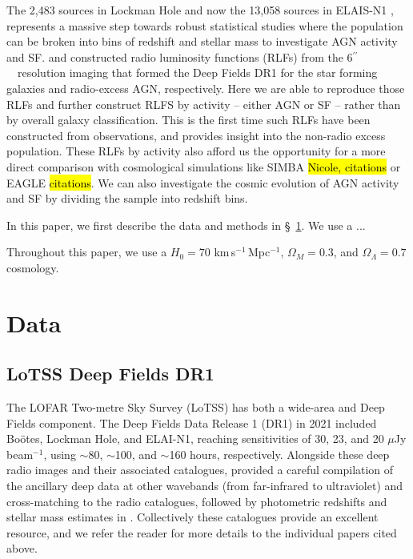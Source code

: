 \documentclass[usenatbib,fleqn,letters]{mnras}
\newcommand{\sarc}{$^{\prime\prime}\!\!$}
\newcommand{\muJybm}{$\mu$Jy$\,$beam$^{-1}$}
\begin{document}
The 2,483 sources in Lockman Hole \citep{sweijen_deep_2022} and now the 13,058 sources in ELAIS-N1 \citep{de_jong_into_2024}, represents a massive step towards robust statistical studies where the population can be broken into bins of redshift and stellar mass to investigate AGN activity and SF.\cite{cochrane_lofar_2023} and \cite{kondapally_cosmic_2022} constructed radio luminosity functions (RLFs) from the 6\sarc\ \ resolution imaging that formed the Deep Fields DR1 for the star forming galaxies and radio-excess AGN, respectively.  Here we are able to reproduce those RLFs and further construct RLFS by activity -- either AGN or SF -- rather than by overall galaxy classification. This is the first time such RLFs have been constructed from observations, and provides insight into the non-radio excess population. These RLFs by activity also afford us the opportunity for a more direct comparison with cosmological simulations like SIMBA \hl{Nicole, citations} or EAGLE \hl{citations}. We can also investigate the cosmic evolution of AGN activity and SF by dividing the sample into redshift bins. 

In this paper, we first describe the data and methods in \S~\ref{sec:data}. We use a ... 

Throughout this paper, we use a $H_0 = 70$ km$\,$s$^{-1}\,$Mpc$^{-1}$, $\Omega_M = 0.3$, and $\Omega_{\Lambda}= 0.7$ cosmology. 


\section{Data}
\label{sec:data}

\subsection{LoTSS Deep Fields DR1}
\label{subsec:dr1}
The LOFAR Two-metre Sky Survey (LoTSS) has both a wide-area \citep{shimwell_lofar_2017,shimwell_lofar_2021,shimwell_lofar_2022} and Deep Fields \citep{tasse_lofar_2021,sabater_lofar_2021} component. The Deep Fields Data Release 1 (DR1) in 2021 included Boötes, Lockman Hole, and ELAI-N1, reaching sensitivities of 30, 23, and 20 \muJybm , using $\sim$80, $\sim$100, and $\sim$160 hours, respectively. Alongside these deep radio images and their associated catalogues, \cite{kondapally_lofar_2021} provided a careful compilation of the ancillary deep data at other wavebands (from far-infrared to ultraviolet) and cross-matching to the radio catalogues, followed by photometric redshifts and stellar mass estimates in \cite{duncan_lofar_2021}. Collectively these catalogues provide an excellent resource, and we refer the reader for more details to the individual papers cited above.
\end{document}
